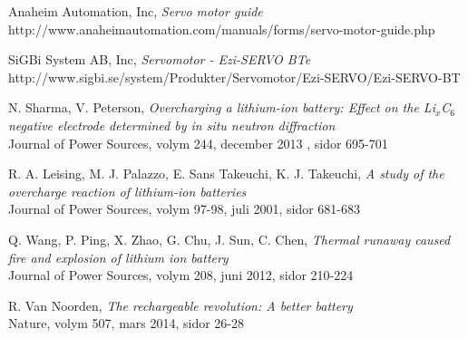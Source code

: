 \documentclass[a4paper,12pt]{article}
\begin{document}
\begin{thebibliography}{9}
 Anaheim Automation, Inc, \emph{Servo motor guide}
\\ http://www.anaheimautomation.com/manuals/forms/servo-motor-guide.php

 SiGBi System AB, Inc, \emph{Servomotor - Ezi-SERVO BTe}\\
http://www.sigbi.se/system/Produkter/Servomotor/Ezi-SERVO/Ezi-SERVO-BT

 N. Sharma, V. Peterson, \emph{Overcharging a lithium-ion battery: Effect on the Li$_{x}$C$_{6}$ negative electrode determined by in situ neutron diffraction}
\\ Journal of Power Sources, volym 244, december 2013 , sidor 695-701

 R. A. Leising, M. J. Palazzo, E. Sans Takeuchi, K. J. Takeuchi, \emph{A study of the overcharge reaction of lithium-ion batteries}
\\ Journal of Power Sources, volym 97-98, juli 2001, sidor 681-683

 Q. Wang, P. Ping, X. Zhao, G. Chu, J. Sun, C. Chen, \emph{Thermal runaway caused fire and explosion of lithium ion battery}
\\ Journal of Power Sources, volym 208, juni 2012, sidor 210-224

 R. Van Noorden, \emph{The rechargeable revolution: A better battery} \\ Nature, volym 507, mars 2014, sidor 26-28

\end{thebibliography}
\end{document}
